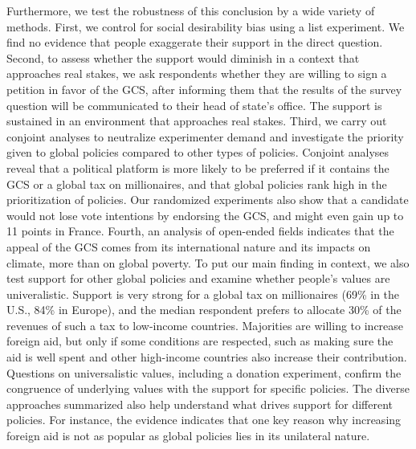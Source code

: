 Furthermore, we test the robustness of this conclusion by a wide variety of methods. First, we control for social desirability bias using a list experiment. We find no evidence that people exaggerate their support in the direct question. Second, to assess whether the support would diminish in a context that approaches real stakes, we ask respondents whether they are willing to sign a petition in favor of the GCS, after informing them that the results of the survey question will be communicated to their head of state's office. The support is sustained in an environment that approaches real stakes. Third, we carry out conjoint analyses to neutralize experimenter demand and investigate the priority given to global policies compared to other types of policies. Conjoint analyses reveal that a political platform is more likely to be preferred if it contains the GCS or a global tax on millionaires, and that global policies rank high in the prioritization of policies. Our randomized experiments also show that a candidate would not lose vote intentions by endorsing the GCS, and might even gain up to 11 points in France. Fourth, an analysis of open-ended fields indicates that the appeal of the GCS comes from its international nature and its impacts on climate, more than on global poverty. %
To put our main finding in context, we also test support for other global policies and examine whether people's values are univeralistic. Support is very strong for a global tax on millionaires (69\% in the U.S., 84\% in Europe), and the median respondent prefers to allocate 30\% of the revenues of such a tax to low-income countries. Majorities are willing to increase foreign aid, but only if some conditions are respected, such as making sure the aid is well spent and other high-income countries also increase their contribution. Questions on universalistic values, including a donation experiment, confirm the congruence of underlying values with the support for specific policies. The diverse approaches summarized also help understand what drives support for different policies. For instance, the evidence indicates that one key reason why increasing foreign aid is not as popular as global policies lies in its unilateral nature.

